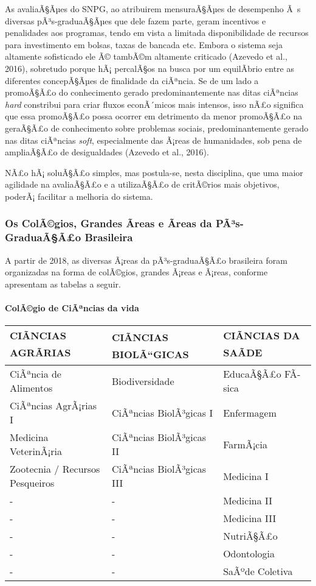 \documentclass[]{article}
\let\oldparagraph\paragraph
\renewcommand{\paragraph}[1]{\oldparagraph{#1}\mbox{}}
\begin{document}
As avaliaÃ§Ãµes do SNPG, ao atribuirem mensuraÃ§Ãµes de desempenho Ã~s
diversas pÃ³s-graduaÃ§Ãµes que dele fazem parte, geram incentivos e
penalidades aos programas, tendo em vista a limitada disponibilidade de
recursos para investimento em bolsas, taxas de bancada etc. Embora o
sistema seja altamente sofisticado ele Ã© tambÃ©m altamente criticado
(Azevedo et al., 2016), sobretudo porque hÃ¡ percalÃ§os na busca por um
equilÃ­brio entre as diferentes concepÃ§Ãµes de finalidade da ciÃªncia.
Se de um lado a promoÃ§Ã£o do conhecimento gerado predominantemente nas
ditas ciÃªncias \emph{hard} constribui para criar fluxos econÃ´micos
mais intensos, isso nÃ£o significa que essa promoÃ§Ã£o possa ocorrer em
detrimento da menor promoÃ§Ã£o na geraÃ§Ã£o de conhecimento sobre
problemas sociais, predominantemente gerado nas ditas ciÃªncias
\emph{soft}, especialmente das Ã¡reas de humanidades, sob pena de
ampliaÃ§Ã£o de desigualdades (Azevedo et al., 2016).

NÃ£o hÃ¡ soluÃ§Ã£o simples, mas postula-se, nesta disciplina, que uma
maior agilidade na avaliaÃ§Ã£o e a utilizaÃ§Ã£o de critÃ©rios mais
objetivos, poderÃ¡ facilitar a melhoria do sistema.

\subsubsection{Os ColÃ©gios, Grandes Ãreas e Ãreas da PÃ³s-GraduaÃ§Ã£o
Brasileira}\label{os-colagios-grandes-areas-e-areas-da-pas-graduaaao-brasileira}

A partir de 2018, as diversas Ã¡reas da pÃ³s-graduaÃ§Ã£o brasileira
foram organizadas na forma de colÃ©gios, grandes Ã¡reas e Ã¡reas,
conforme apresentam as tabelas a seguir.

\paragraph{ColÃ©gio de CiÃªncias da
vida}\label{colagio-de-ciancias-da-vida}

\begin{longtable}[]{@{}lll@{}}
\toprule
CIÃNCIAS AGRÃRIAS & CIÃNCIAS BIOLÃ``GICAS & CIÃNCIAS DA
SAÃDE\tabularnewline
\midrule
\endhead
CiÃªncia de Alimentos & Biodiversidade & EducaÃ§Ã£o
FÃ­sica\tabularnewline
CiÃªncias AgrÃ¡rias I & CiÃªncias BiolÃ³gicas I &
Enfermagem\tabularnewline
Medicina VeterinÃ¡ria & CiÃªncias BiolÃ³gicas II &
FarmÃ¡cia\tabularnewline
Zootecnia / Recursos Pesqueiros & CiÃªncias BiolÃ³gicas III & Medicina
I\tabularnewline
- & - & Medicina II\tabularnewline
- & - & Medicina III\tabularnewline
- & - & NutriÃ§Ã£o\tabularnewline
- & - & Odontologia\tabularnewline
- & - & SaÃºde Coletiva\tabularnewline
\bottomrule
\end{longtable}
\end{document}

